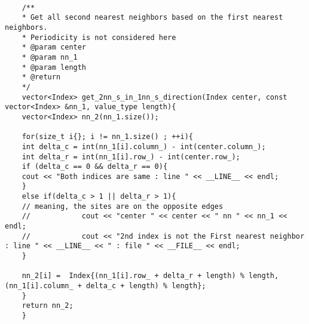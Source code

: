 \begin{lstlisting}[style=CStyle]
	
	/**
	* Get all second nearest neighbors based on the first nearest neighbors.
	* Periodicity is not considered here
	* @param center
	* @param nn_1
	* @param length
	* @return
	*/
	vector<Index> get_2nn_s_in_1nn_s_direction(Index center, const vector<Index> &nn_1, value_type length){
	vector<Index> nn_2(nn_1.size());
	
	for(size_t i{}; i != nn_1.size() ; ++i){
	int delta_c = int(nn_1[i].column_) - int(center.column_);
	int delta_r = int(nn_1[i].row_) - int(center.row_);
	if (delta_c == 0 && delta_r == 0){
	cout << "Both indices are same : line " << __LINE__ << endl;
	}
	else if(delta_c > 1 || delta_r > 1){
	// meaning, the sites are on the opposite edges
	//            cout << "center " << center << " nn " << nn_1 << endl;
	//            cout << "2nd index is not the First nearest neighbor : line " << __LINE__ << " : file " << __FILE__ << endl;
	}
	
	nn_2[i] =  Index{(nn_1[i].row_ + delta_r + length) % length, (nn_1[i].column_ + delta_c + length) % length};
	}
	return nn_2;
	}
	
	\end{lstlisting}
	
	
